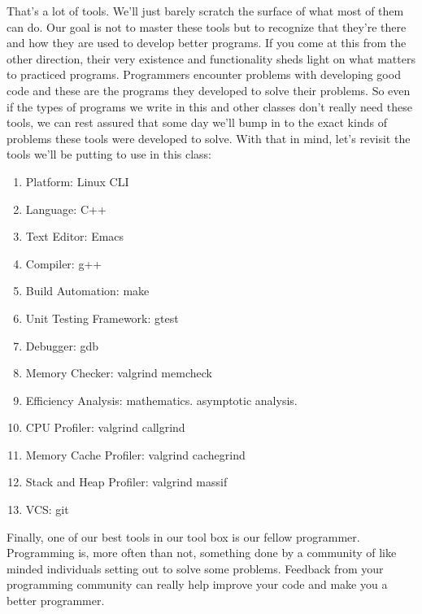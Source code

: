 \documentclass[]{tufte-handout}
\begin{document}
That's a lot of tools.  We'll just barely scratch the surface of what most of them can do.  Our goal is not to master these tools but to recognize that they're there and how they are used to develop better programs. If you come at this from the other direction, their very existence and functionality sheds light on what matters to practiced programs.  Programmers encounter problems with developing good code and these are the programs they developed to solve their problems.  So even if the types of programs we write in this and other classes don't really need these tools, we can rest assured that some day we'll bump in to the exact kinds of problems these tools were developed to solve. With that in mind, let's revisit the tools we'll be putting to use in this class:
\begin{enumerate}
\item Platform: Linux CLI
\item Language: C++
\item Text Editor: Emacs
\item Compiler: g++
\item Build Automation: make
\item Unit Testing Framework: gtest
\item Debugger: gdb
\item Memory Checker: valgrind memcheck
\item Efficiency Analysis: mathematics. asymptotic analysis. 
\item CPU Profiler: valgrind callgrind
\item Memory Cache Profiler: valgrind cachegrind
\item Stack and Heap Profiler: valgrind massif
\item VCS: git
\end{enumerate}   
Finally, one of our best tools in our tool box is our fellow programmer. Programming is, more often than not, something done by a community of like minded individuals setting out to solve some problems. Feedback from your programming community can really help improve your code and make you a better programmer.  
\end{document}
